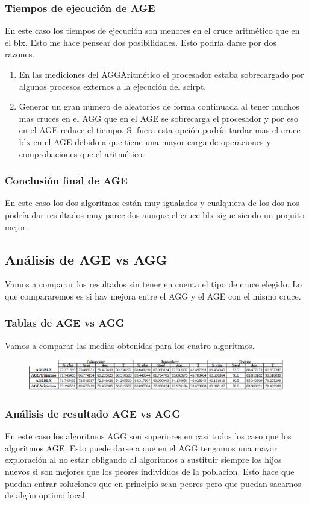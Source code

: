 \documentclass[titlepage]{article}
\begin{document}
	\subsubsection{Tiempos de ejecución de AGE}
	En este caso los tiempos de ejecución son menores en el cruce aritmético que en el blx. Esto me hace pensear dos posibilidades. Esto podría darse por dos razones.
	\begin{enumerate}
		\item En las mediciones del AGGAritmético el procesador estaba sobrecargado por algunos procesos externos a la ejecución del scirpt.
		\item Generar un gran número de aleatorios de forma continuada al tener muchos mas cruces en el AGG que en el AGE se sobrecarga el procesador y por eso en el AGE reduce el tiempo. Si fuera esta opción podría tardar mas el cruce blx en el AGE debido a que tiene una mayor carga de operaciones y comprobaciones que el aritmético. 
	\end{enumerate}
	
	\subsubsection{Conclusión final de AGE}
	En este caso los dos algoritmos están muy igualados y cualquiera de los dos nos podría dar resultados muy parecidos aunque el cruce blx sigue siendo un poquito mejor.
	
	\subsection{Análisis de AGE vs AGG}
	Vamos a comparar los resultados sin tener en cuenta el tipo de cruce elegido. Lo que compararemos es si hay mejora entre el AGG y el AGE con el mismo cruce.
	\subsubsection{Tablas de AGE vs AGG}
	Vamos a comparar las medias obtenidas para los cuatro algoritmos.
	\begin{figure}[H]
		\centering
		\includegraphics[width=1\linewidth]{screenshot008}
		\caption{}
		\label{fig:screenshot008}
	\end{figure}

	\subsubsection{Análisis de resultado AGE vs AGG}
	En este caso los algoritmos AGG son superiores en casi todos los caso que los algoritmos AGE. Esto puede darse a que en el AGG tengamos una mayor exploración al no estar obligando al algoritmos a sustituir siempre los hijos  nuevos si son mejores que los peores individuos de la poblacion. Esto hace que puedan entrar soluciones que en principio sean peores pero que puedan sacarnos de algún optimo local. 
\end{document}
